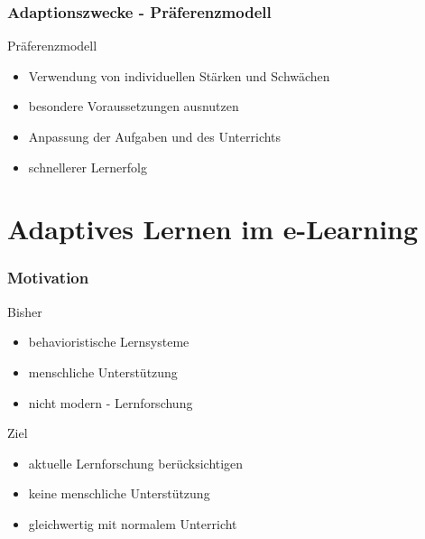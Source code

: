 \documentclass{beamer}
\begin{document}
\begin{frame}
  \frametitle{Adaptionszwecke - Präferenzmodell}
  \begin{block}{Präferenzmodell}
    \begin{itemize}
      \item Verwendung von individuellen Stärken und Schwächen
      \item besondere Voraussetzungen ausnutzen
      \item Anpassung der Aufgaben und des Unterrichts
      \item schnellerer Lernerfolg
    \end{itemize}
  \end{block}
\end{frame}

\section{Adaptives Lernen im e-Learning}
\begin{frame}
  \frametitle{Motivation}
    \begin{alertblock}{Bisher}
      \begin{itemize}
        \item behavioristische Lernsysteme
        \item menschliche Unterstützung
        \item nicht \glqq modern\grqq{} - Lernforschung
      \end{itemize}
    \end{alertblock}

    \begin{block}{Ziel}
      \begin{itemize}
        \item aktuelle Lernforschung berücksichtigen
        \item keine menschliche Unterstützung
        \item gleichwertig mit normalem Unterricht
      \end{itemize}
    \end{block}
\end{frame}
\end{document}
